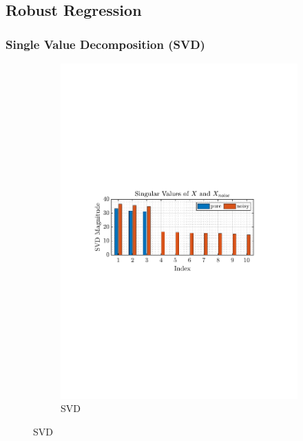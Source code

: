\documentclass[12pt]{article}
\begin{document}
	
	
	\subsection{Robust Regression} \label{sec: 1-6-robust-regression}
 
 	\subsubsection{Single Value Decomposition (SVD)}
	\begin{figure}[H]
		\centering
		\begin{subfigure}{0.49\textwidth}
			\centering
			\includegraphics[trim={2.2cm 11.2cm 3.15cm  11.2cm}, clip, width=\textwidth]{../MATLAB/figures/q1_6a_fig01.pdf} 
			\captionsetup{justification=centering}
			\caption{SVD}
		\end{subfigure}

\end{figure}
\end{document}
